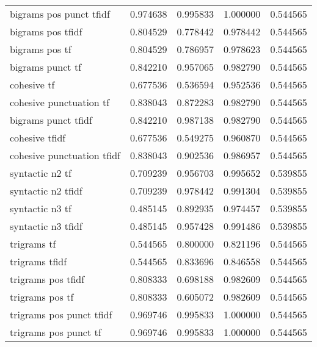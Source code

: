\documentclass{article}
\begin{document}
\begin{table}
\begin{tabular}{lrrrr}
bigrams pos punct tfidf    &  0.974638 &     0.995833 &       1.000000 &             0.544565 \\
bigrams pos tfidf          &  0.804529 &     0.778442 &       0.978442 &             0.544565 \\
bigrams pos tf             &  0.804529 &     0.786957 &       0.978623 &             0.544565 \\
bigrams punct tf           &  0.842210 &     0.957065 &       0.982790 &             0.544565 \\
cohesive tf                &  0.677536 &     0.536594 &       0.952536 &             0.544565 \\
cohesive punctuation tf    &  0.838043 &     0.872283 &       0.982790 &             0.544565 \\
bigrams punct tfidf        &  0.842210 &     0.987138 &       0.982790 &             0.544565 \\
cohesive tfidf             &  0.677536 &     0.549275 &       0.960870 &             0.544565 \\
cohesive punctuation tfidf &  0.838043 &     0.902536 &       0.986957 &             0.544565 \\
syntactic n2 tf            &  0.709239 &     0.956703 &       0.995652 &             0.539855 \\
syntactic n2 tfidf         &  0.709239 &     0.978442 &       0.991304 &             0.539855 \\
syntactic n3 tf            &  0.485145 &     0.892935 &       0.974457 &             0.539855 \\
syntactic n3 tfidf         &  0.485145 &     0.957428 &       0.991486 &             0.539855 \\
trigrams tf                &  0.544565 &     0.800000 &       0.821196 &             0.544565 \\
trigrams tfidf             &  0.544565 &     0.833696 &       0.846558 &             0.544565 \\
trigrams pos tfidf         &  0.808333 &     0.698188 &       0.982609 &             0.544565 \\
trigrams pos tf            &  0.808333 &     0.605072 &       0.982609 &             0.544565 \\
trigrams pos punct tfidf   &  0.969746 &     0.995833 &       1.000000 &             0.544565 \\
trigrams pos punct tf      &  0.969746 &     0.995833 &       1.000000 &             0.544565 \\

\end{tabular}
\end{table}
\end{document}
